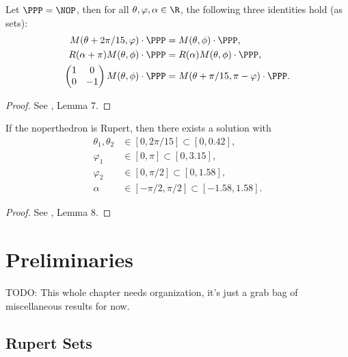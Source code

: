 \begin{lemma} \label{lem:symmetries}
\leanok
{}
Let $\PPP = \NOP$, then for all $\theta, \varphi, \alpha \in \R$, the following three identities hold (as sets):
\begin{align*}
    M({\theta+2\pi/15,\varphi})\cdot \PPP &=M(\theta, \phi) \cdot \PPP,\\
    R(\alpha+\pi)M(\theta, \phi) \cdot \PPP &=R(\alpha)M(\theta, \phi) \cdot \PPP,\\
    \begin{pmatrix}
        1&0\\
        0&-1
    \end{pmatrix}
    M(\theta, \phi) \cdot \PPP&=
    M({\theta+\pi/15,\pi-\varphi}) \cdot \PPP.
\end{align*}
\end{lemma}
\begin{proof}
\leanok
See \cite{polyhedron.without.rupert}, Lemma 7.
\end{proof}


\begin{corollary}
\label{cor:rupert_tightening}
\leanok
If the noperthedron is Rupert, then there exists a solution with
\begin{align*}
\theta_1,\theta_2&\in[0,2\pi/15] \subset [0,0.42], \\
\varphi_1&\in [0,\pi] \subset [0,3.15],\\
\varphi_2&\in [0,\pi/2] \subset [0,1.58],\\
\alpha &\in [-\pi/2,\pi/2] \subset [-1.58,1.58].
\end{align*}
\end{corollary}

\begin{proof}
\leanok
See \cite{polyhedron.without.rupert}, Lemma 8.
\end{proof}


\chapter{Preliminaries}

TODO: This whole chapter needs organization, it's just a grab bag of miscellaneous results for now.

\section{Rupert Sets}


